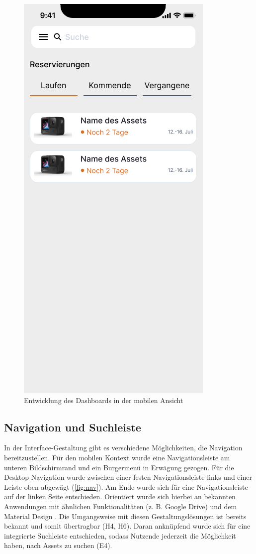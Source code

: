 \begin{figure}[h]
    \includegraphics[scale=0.4]{Bilder/Prototyp/Neu/V2.png}
    \caption{Entwicklung des Dashboards in der mobilen Ansicht}
    \label{fig:home}
\end{figure}

\subsection{Navigation und Suchleiste}
In der Interface-Gestaltung gibt es verschiedene Möglichkeiten, die Navigation
bereitzustellen. Für den mobilen Kontext wurde eine Navigationsleiste am unteren
Bildschirmrand und ein Burgermenü in Erwägung gezogen. Für die
Desktop-Navigation wurde zwischen einer festen Navigationsleiste links und einer
Leiste oben abgewägt (\ref{fig:nav}). Am Ende wurde sich für eine
Navigationsleiste auf der linken Seite entschieden. Orientiert wurde sich
hierbei an bekannten Anwendungen mit ähnlichen Funktionalitäten (z. B. Google
Drive) und dem Material Design \cite{google_material_2022}. Die Umgangsweise mit
diesen Gestaltungslösungen ist bereits bekannt und somit übertragbar (H4, H6).
Daran anknüpfend wurde sich für eine integrierte Suchleiste entschieden, sodass
Nutzende jederzeit die Möglichkeit haben, nach Assets zu suchen
\cite{google_material_2022} (E4).


